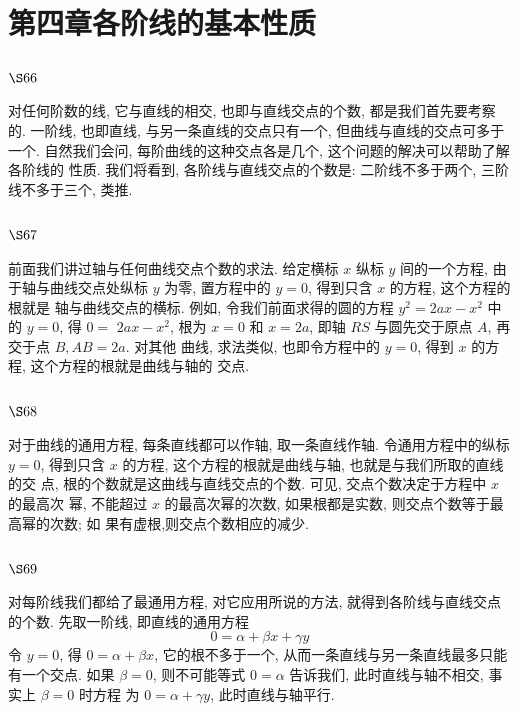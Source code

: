 \chapter{第四章各阶线的基本性质}

\section{$\S 66$}

对任何阶数的线, 它与直线的相交, 也即与直线交点的个数, 都是我们首先要考察 的. 一阶线, 也即直线, 与另一条直线的交点只有一个, 但曲线与直线的交点可多于一个. 自然我们会问, 每阶曲线的这种交点各是几个, 这个问题的解决可以帮助了解各阶线的 性质. 我们将看到, 各阶线与直线交点的个数是: 二阶线不多于两个, 三阶线不多于三个, 类推.

\section{$\S 67$}

前面我们讲过轴与任何曲线交点个数的求法. 给定横标 $x$ 纵标 $y$ 间的一个方程, 由 于轴与曲线交点处纵标 $y$ 为零, 置方程中的 $y=0$, 得到只含 $x$ 的方程, 这个方程的根就是 轴与曲线交点的横标. 例如, 令我们前面求得的圆的方程 $y^{2}=2 a x-x^{2}$ 中的 $y=0$, 得 $0=$ $2 a x-x^{2}$, 根为 $x=0$ 和 $x=2 a$, 即轴 $R S$ 与圆先交于原点 $A$, 再交于点 $B, A B=2 a$. 对其他 曲线, 求法类似, 也即令方程中的 $y=0$, 得到 $x$ 的方程, 这个方程的根就是曲线与轴的 交点.

\section{$\S 68$}

对于曲线的通用方程, 每条直线都可以作轴, 取一条直线作轴. 令通用方程中的纵标 $y=0$, 得到只含 $x$ 的方程, 这个方程的根就是曲线与轴, 也就是与我们所取的直线的交 点, 根的个数就是这曲线与直线交点的个数. 可见, 交点个数决定于方程中 $x$ 的最高次 幂, 不能超过 $x$ 的最高次幂的次数, 如果根都是实数, 则交点个数等于最高幂的次数; 如 果有虚根,则交点个数相应的减少.

\section{$\S 69$}

对每阶线我们都给了最通用方程, 对它应用所说的方法, 就得到各阶线与直线交点 的个数. 先取一阶线, 即直线的通用方程
\[
0=\alpha+\beta x+\gamma y
\]
令 $y=0$, 得 $0=\alpha+\beta x$, 它的根不多于一个, 从而一条直线与另一条直线最多只能有一个交点. 如果 $\beta=0$, 则不可能等式 $0=\alpha$ 告诉我们, 此时直线与轴不相交, 事实上 $\beta=0$ 时方程 为 $0=\alpha+\gamma y$, 此时直线与轴平行.

